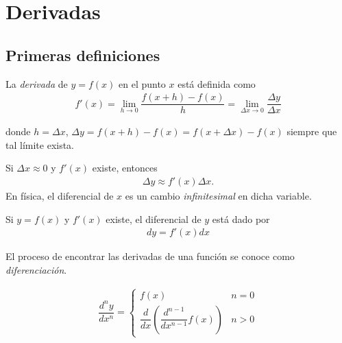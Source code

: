 \section{Derivadas}

\subsection{Primeras definiciones}

\begin{definicion}
	  La \emph{derivada} de $y=f(x)$ en el punto $x$ está definida como
	\begin{align}
		f'(x)= \lim_{h\to 0}\dfrac{f(x+h)-f(x)}{h}
		= \lim_{\Delta x \to 0}\dfrac{\Delta y}{\Delta x}
	\end{align}

	donde $h=\Delta x$, $\Delta y=f(x+h)-f(x)=f(x+\Delta x)-f(x)$ siempre que tal límite exista.
\end{definicion}

\begin{observacion}
	Si $\Delta x \approx 0$ y $f'(x)$ existe, entonces
	\begin{align}
		\Delta y \approx f'(x) \Delta x.
	\end{align}
	En física, el diferencial de $x$ es un cambio \emph{infinitesimal}  en dicha variable.
\end{observacion}



{}
  \begin{definicion}
   Si $y = f(x)$ y $f'(x)$ existe, el diferencial de $y$ está dado por
   \begin{align}
    dy = f'(x)dx
    \end{align}
  \end{definicion}



{}
  El proceso de encontrar las derivadas de una función se conoce como \emph{diferenciación}.


{}
  \begin{definicion}
   \begin{align}
    \dfrac{d^{n}y}{dx^{n}}=
    \begin{cases}
f(x) & n=0 \\
\dfrac{d}{dx}\left( \dfrac{d^{n-1}}{dx^{n-1}}f(x) \right) & n>0
\end{cases}
    \end{align}
  \end{definicion}



